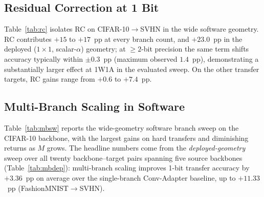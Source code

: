 \documentclass[journal]{IEEEtran}
\begin{document}
\subsection{Residual Correction at 1 Bit}
Table~\ref{tab:rc} isolates RC on CIFAR-10$\to$SVHN in the wide software geometry. RC contributes $+15$ to $+17$~pp at every branch count, and $+23.0$~pp in the deployed ($1{\times}1$, scalar-$\alpha$) geometry; at ${\geq}2$-bit precision the same term shifts accuracy typically within $\pm 0.3$~pp (maximum observed $1.4$~pp), demonstrating a substantially larger effect at 1W1A in the evaluated sweep. On the other transfer targets, RC gains range from $+0.6$ to $+7.4$~pp.

\begin{table}[!t]
\centering
\caption{RC ablation at 1 bit, wide geometry (CIFAR-10 $\to$ SVHN).}
\label{tab:rc}
\small
{}
\end{table}

\subsection{Multi-Branch Scaling in Software}
Table~\ref{tab:mbsw} reports the wide-geometry software branch sweep on the CIFAR-10 backbone, with the largest gains on hard transfers and diminishing returns as $M$ grows. The headline numbers come from the \emph{deployed-geometry} sweep over all twenty backbone--target pairs spanning five source backbones (Table~\ref{tab:mbdep}): multi-branch scaling improves 1-bit transfer accuracy by $+3.36$~pp on average over the single-branch Conv-Adapter baseline, up to $+11.33$~pp (FashionMNIST$\to$SVHN).
\end{document}
